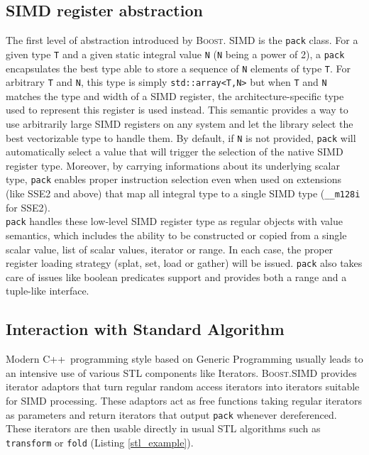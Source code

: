 \documentclass[preprint]{sigplanconf}
\providecommand{\boostsimd}{\textsc{Boost.SIMD}}
\providecommand{\cpp}[1][~]{\textsc{C++}#1}
\begin{document}
\subsection{SIMD register abstraction}
The first level of abstraction introduced by \textsc{Boost.} \textsc{SIMD} is
the \texttt{pack} class. For a given type \texttt{T} and a given static integral 
value \texttt{N} (\texttt{N} being a power of 2), a \texttt{pack} encapsulates
the best type able to store a sequence of \texttt{N} elements of type \texttt{T}.
For arbitrary \texttt{T} and \texttt{N}, this type is simply \texttt{std::array<T,N>}
but when \texttt{T} and \texttt{N} matches the type and width of a SIMD register,
the architecture-specific type used to represent this register is used instead.
This semantic provides a way to use arbitrarily large SIMD registers on any system
and let the library select the best vectorizable type to handle them. By default,
if \texttt{N} is not provided, \texttt{pack} will automatically select a value
that will trigger the selection of the native SIMD register type. Moreover, by
carrying informations about its underlying scalar type, \texttt{pack} enables
proper instruction selection even when used on extensions (like SSE2 and above)
that map all integral type to a single SIMD type (\texttt{\_\_m128i} for SSE2).\\

\texttt{pack} handles these low-level SIMD register type as regular objects with
value semantics, which includes the ability to be constructed or copied from a
single scalar value, list of scalar values, iterator or range. In each case, the
proper register loading strategy (splat, set, load or gather) will be issued.
\texttt{pack} also takes care of issues like boolean predicates support and provides
both a range and a tuple-like interface.

\subsection{Interaction with Standard Algorithm}
Modern \cpp programming style based on Generic Programming usually leads to an
intensive use of various STL components like Iterators. \boostsimd{} provides
iterator adaptors that turn regular random access iterators into iterators
suitable for SIMD processing. These adaptors act as free functions taking
regular iterators as parameters and return iterators that output \texttt{pack}
whenever dereferenced. These iterators are then usable directly in usual STL
algorithms such as \texttt{transform} or \texttt{fold} (Listing \ref{stl_example}).
\end{document}
